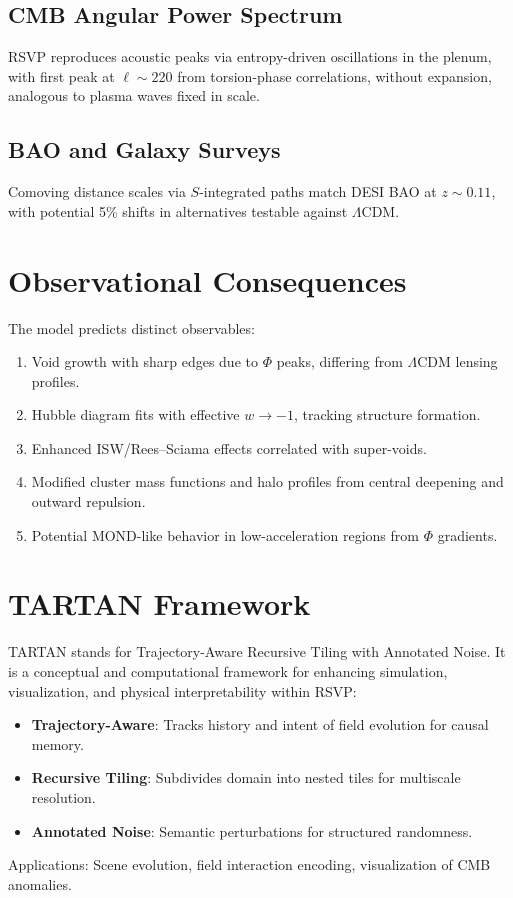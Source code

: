 \documentclass[11pt]{article}
\theoremstyle{plain}
\theoremstyle{definition}
\begin{document}
\subsection{CMB Angular Power Spectrum}
RSVP reproduces acoustic peaks via entropy-driven oscillations in the plenum, with first peak at $\ell \sim 220$ from torsion-phase correlations, without expansion, analogous to plasma waves fixed in scale.
\subsection{BAO and Galaxy Surveys}
Comoving distance scales via $S$-integrated paths match DESI BAO at $z\sim0.11$, with potential 5\% shifts in alternatives testable against $\Lambda$CDM.
\section{Observational Consequences}
The model predicts distinct observables:
\begin{enumerate}
\item Void growth with sharp edges due to $\Phi$ peaks, differing from $\Lambda$CDM lensing profiles.
\item Hubble diagram fits with effective $w \to -1$, tracking structure formation.
\item Enhanced ISW/Rees--Sciama effects correlated with super-voids.
\item Modified cluster mass functions and halo profiles from central deepening and outward repulsion.
\item Potential MOND-like behavior in low-acceleration regions from $\Phi$ gradients.
\end{enumerate}
\section{TARTAN Framework}
TARTAN stands for Trajectory-Aware Recursive Tiling with Annotated Noise. It is a conceptual and computational framework for enhancing simulation, visualization, and physical interpretability within RSVP:
\begin{itemize}
    \item \textbf{Trajectory-Aware}: Tracks history and intent of field evolution for causal memory.
    \item \textbf{Recursive Tiling}: Subdivides domain into nested tiles for multiscale resolution.
    \item \textbf{Annotated Noise}: Semantic perturbations for structured randomness.
\end{itemize}
Applications: Scene evolution, field interaction encoding, visualization of CMB anomalies.
\end{document}
